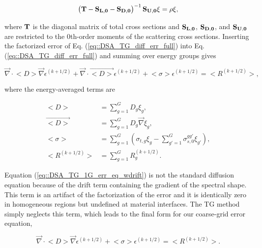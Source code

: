 \begin{equation}
\label{eq::DSA_TG_eigenpprob}
\left(  {\bf T} - {\bf S_{L,0}} - {\bf S_{D,0}} \right)^{-1} {\bf S_{U,0}} \xi = \rho \xi ,
\end{equation}

\noindent where ${\bf T}$ is the diagonal matrix of total cross sections and ${\bf S_{L,0}}$, ${\bf S_{D,0}}$, and ${\bf S_{U,0}}$ are restricted to the 0th-order moments of the scattering cross sections. Inserting the factorized error of Eq. (\ref{eq::DSA_TG_diff_err_full}) into Eq. (\ref{eq::DSA_TG_diff_err_full}) and summing over energy groups gives

\begin{equation}
\label{eq::DSA_TG_1G_err_eq_wdrift}
\vec{\nabla} \cdot \big< D \big> \vec{\nabla} \epsilon^{(k+1/2)} + \vec{\nabla} \cdot \vec{\big< D \big>} \epsilon^{(k+1/2)} + \big< \sigma \big> \epsilon^{(k+1/2)}  = \big< R^{(k+1/2)} \big> ,
\end{equation}

\noindent where the energy-averaged terms are 

\begin{equation}
\label{eq::DSA_TG_1G_ave_terms}
\begin{aligned}
\big< D \big> &= \sum_{g=1}^G D_g \xi_g, \\
\vec{\big< D \big>} &= \sum_{g=1}^G D_g \vec{\nabla} \xi_g ,\\
\big< \sigma \big> &= \sum_{g=1}^G \left( \sigma_{t,g} \xi_g -  \sum_{g'=1}^G \sigma_{s,0}^{g g'}  \xi_{g'} \right), \\
\big< R^{(k+1/2)} \big> &= \sum_{g=1}^G R_g^{(k+1/2)}.
\end{aligned}
\end{equation}

\noindent Equation (\ref{eq::DSA_TG_1G_err_eq_wdrift}) is not the standard diffusion equation because of the drift term containing the gradient of the spectral shape. This term is an artifact of the factorization of the error and it is identically zero in homogeneous regions but undefined at material interfaces. The TG method simply neglects this term, which leads to the final form for our coarse-grid error equation,

\begin{equation}
\label{eq::DSA_TG_1G_err_eq}
\vec{\nabla} \cdot \big< D \big> \vec{\nabla} \epsilon^{(k+1/2)}  + \big< \sigma \big> \epsilon^{(k+1/2)}  = \big< R^{(k+1/2)} \big> .
\end{equation}


